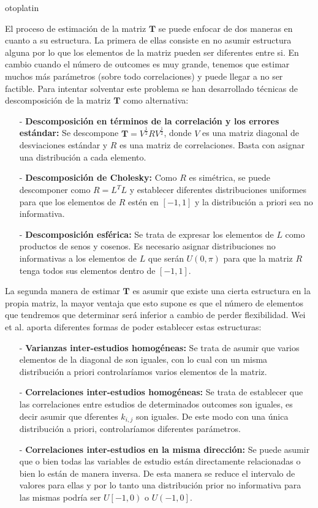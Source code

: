 otoplatin\documentclass[a4paper,openright,12pt]{report}
\begin{document}
El proceso de estimación de la matriz $\mathbf{T}$ se puede enfocar de dos maneras en cuanto a su estructura\cite{Wei2013}\cite{Mavridis2011}. La primera de ellas consiste en no asumir estructura alguna por lo que los elementos de la matriz pueden ser diferentes entre si. En cambio cuando el número de outcomes es muy grande, tenemos que estimar muchos más parámetros (sobre todo correlaciones) y puede llegar a no ser factible. Para intentar solventar este problema se han desarrollado técnicas de descomposición de la matriz $\mathbf{T}$ como alternativa:
\begin{itemize}
\item[-] \textbf{Descomposición en términos de la correlación y los errores estándar:} Se descompone $\mathbf{T}=V^{\frac{1}{2}}RV^{\frac{1}{2}}$, donde $V$ es una matriz diagonal de desviaciones estándar y $R$ es una matriz de correlaciones. Basta con asignar una distribución a cada elemento.
\item[-] \textbf{Descomposición de Cholesky:} Como $R$ es simétrica, se puede descomponer como $R=L^{T}L$ y establecer diferentes distribuciones uniformes para que los elementos de $R$ estén en $\left[-1,1\right]$ y la distribución a priori sea no informativa.
\item[-] \textbf{Descomposición esférica:} Se trata de expresar los elementos de $L$ como productos de senos y cosenos. Es necesario asignar distribuciones no informativas a los elementos de $L$ que serán $U(0,\pi)$ para que la matriz $R$ tenga todos sus elementos dentro de $\left[-1,1\right]$.
\end{itemize}

La segunda manera de estimar $\mathbf{T}$ es asumir que existe una cierta estructura en la propia matriz, la mayor ventaja que esto supone es que el número de elementos que tendremos que determinar será inferior a cambio de perder flexibilidad. Wei et al. aporta diferentes formas de poder establecer estas estructuras:
\begin{itemize}
\item[-] \textbf{Varianzas inter-estudios homogéneas:} Se trata de asumir que varios elementos de la diagonal de  son iguales, con lo cual con un misma distribución a priori controlaríamos varios elementos de la matriz.
\item[-] \textbf{Correlaciones inter-estudios homogéneas:} Se trata de establecer que las correlaciones entre estudios de determinados outcomes son iguales, es decir asumir que dferentes $k_{i,j}$ son iguales. De este modo con una única distribución a priori, controlaríamos diferentes parámetros.
\item[-] \textbf{Correlaciones inter-estudios en la misma dirección:} Se puede asumir que o bien todas las variables de estudio están directamente relacionadas o bien lo están de manera inversa. De esta manera se reduce el intervalo de valores para ellas y por lo tanto una distribución prior no informativa para las mismas podría ser $U\left[-1,0\right)$ o $U\left(-1,0\right]$. 
\end{itemize}
\end{document}
